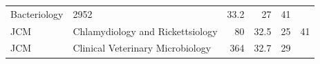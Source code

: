 \documentclass[11pt,]{article}
\begin{document}
\begin{longtable}[]{@{}llrrrr@{}}
\begin{minipage}[t]{0.43\columnwidth}
Bacteriology\strut
\end{minipage} & \begin{minipage}[t]{0.04\columnwidth}\raggedleft\strut
2952\strut
\end{minipage} & \begin{minipage}[t]{0.08\columnwidth}\raggedleft\strut
33.2\strut
\end{minipage} & \begin{minipage}[t]{0.11\columnwidth}\raggedleft\strut
27\strut
\end{minipage} & \begin{minipage}[t]{0.11\columnwidth}\raggedleft\strut
41\strut
\end{minipage}\tabularnewline
\begin{minipage}[t]{0.06\columnwidth}\raggedright\strut
JCM\strut
\end{minipage} & \begin{minipage}[t]{0.43\columnwidth}\raggedright\strut
Chlamydiology and Rickettsiology\strut
\end{minipage} & \begin{minipage}[t]{0.04\columnwidth}\raggedleft\strut
80\strut
\end{minipage} & \begin{minipage}[t]{0.08\columnwidth}\raggedleft\strut
32.5\strut
\end{minipage} & \begin{minipage}[t]{0.11\columnwidth}\raggedleft\strut
25\strut
\end{minipage} & \begin{minipage}[t]{0.11\columnwidth}\raggedleft\strut
41\strut
\end{minipage}\tabularnewline
\begin{minipage}[t]{0.06\columnwidth}\raggedright\strut
JCM\strut
\end{minipage} & \begin{minipage}[t]{0.43\columnwidth}\raggedright\strut
Clinical Veterinary Microbiology\strut
\end{minipage} & \begin{minipage}[t]{0.04\columnwidth}\raggedleft\strut
364\strut
\end{minipage} & \begin{minipage}[t]{0.08\columnwidth}\raggedleft\strut
32.7\strut
\end{minipage} & \begin{minipage}[t]{0.11\columnwidth}\raggedleft\strut
29\strut
\end{minipage} & \begin{minipage}[t]{0.11\columnwidth}\raggedleft\strut

\end{minipage}
\end{longtable}
\end{document}
